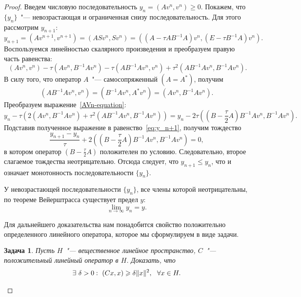 \documentclass[11pt,a4paper,twoside]{report}
\numberwithin{equation}{section}
\newtheorem*{problem}{Задача}
\theoremstyle{definition}
\theoremstyle{plain}
\DeclarePairedDelimiter\norm{\lVert}{\rVert}
\begin{document}
\begin{proof}
    Введем числовую последовательность $y_n = (Av^n, v^n) \geqslant 0$.
    Покажем, что $\{y_n\}$~"--- невозрастающая и ограниченная снизу
    последовательность. Для этого рассмотрим $y_{n+1}$:
    \begin{equation}
        \label{eq:y_n+1}
        y_{n+1} = (Av^{n+1}, v^{n+1}) = (ASv^n, Sv^n) =
            ((A - {\tau}AB^{-1}A)v^n, (E - {\tau}B^{-1}A)v^n).
    \end{equation}
    Воспользуемся линейностью скалярного произведения и преобразуем
    правую часть равенства:
    \begin{equation}
        \label{AVn-equation}
        ~
        (Av^n, v^n) - \tau (Av^n, B^{-1}Av^n) - \tau (AB^{-1}Av^n, v^n) +
            \tau^2(AB^{-1}Av^n, B^{-1}Av^n).
    \end{equation}
    В силу того, что оператор $A$~"--- самосопряженный $\left(A=A^*\right)$, получим
    $$
        \left(AB^{-1}Av^n,v^n\right) = \left(B^{-1}Av^n,A^*v^n\right)=
             \left(Av^n,B^{-1}Av^n\right).
    $$
    Преобразуем выражение~\eqref{AVn-equation}:
    $$
        y_n - \tau\left(2(Av^n, B^{-1}Av^n) +
            \tau^2(AB^{-1}Av^n, B^{-1}Av^n)\right)=
        y_n - 2\tau\left(\left(B - \frac{\tau}{2}A\right)B^{-1}Av^n, B^{-1}Av^n\right).
    $$
    Подставив полученное выражение в равенство~\eqref{eq:y_n+1}, получим тождество
    \begin{equation}
        \label{eq:wn-1}
        \frac{y_{n+1} - y_n}{\tau} +
        2\left(\left(B - \frac{\tau}{2}A\right)B^{-1}Av^n, B^{-1}Av^n\right) = 0,
    \end{equation}
    в котором оператор $\left(B - \frac{\tau}{2}A\right)$
    положителен по условию. Следовательно, второе слагаемое тождества неотрицательно.
    Отсюда следует,
    что $y_{n+1} \leqslant y_n$, что и означает монотонность последовательности
    $\{y_n\}$.

    У невозрастающей последовательности $\{y_n\}$, все члены которой
    неотрицательны, по теореме Вейерштрасса существует предел $y$:
    $$
        \lim_{n \to \infty} y_n = y.
    $$

    Для дальнейшего доказательства нам понадобится свойство
    положительно определенного линейного оператора,
    которое мы сформулируем в виде задачи.
    \begin{problem}
        Пусть $H$~"--- вещественное линейное пространство, $C$~"---
        положительный линейный оператор в $H$. Доказать, что
        \begin{equation}
            \label{eq:delta-prop}
            \exists ~\delta > 0: ~(Cx, x) \geqslant \delta\norm{x}^2,~~\forall x \in H.
        \end{equation}
    \end{problem}


\end{proof}
\end{document}
